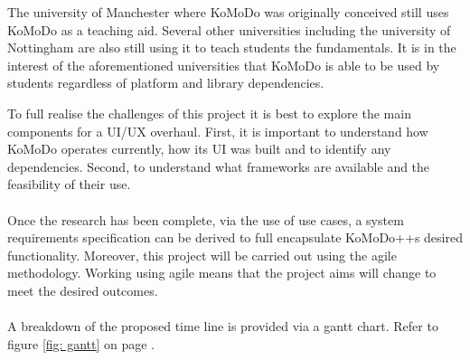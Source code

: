 The university of Manchester where KoMoDo was originally conceived still uses KoMoDo as a teaching aid. Several other universities including the university of Nottingham are also still using it to teach students the fundamentals. It is in the interest of the aforementioned universities that KoMoDo is able to be used by students regardless of platform and library dependencies.

To full realise the challenges of this project it is best to explore the main components for a UI/UX overhaul. First, it is important to understand how KoMoDo operates currently, how its UI was built and to identify any dependencies. Second, to understand what frameworks are available and the feasibility of their use. \\\\
%
Once the research has been complete, via the use of use cases, a system requirements specification can be derived to full encapsulate KoMoDo++s desired functionality. Moreover, this project will be carried out using the agile methodology. Working using agile means that the project aims will change to meet the desired outcomes.\\\\
%
A breakdown of the proposed time line is provided via a gantt chart. Refer to figure \ref{fig: gantt} on page \pageref{fig: gantt}.
